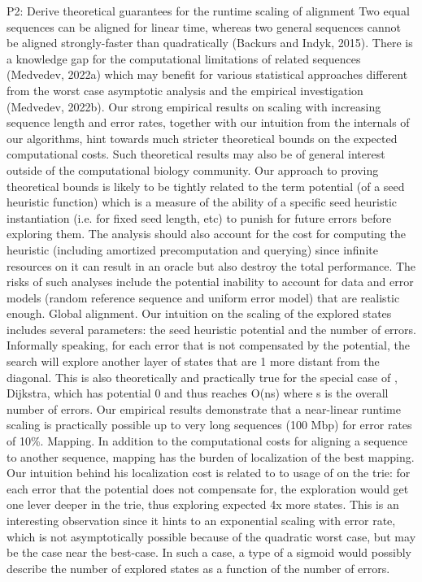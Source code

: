 P2: Derive theoretical guarantees for the runtime scaling of \A alignment Two
equal sequences can be aligned for linear time, whereas two general sequences
cannot be aligned strongly-faster than quadratically (Backurs and Indyk, 2015).
There is a knowledge gap for the computational limitations of related sequences
(Medvedev, 2022a) which may benefit for various statistical approaches different
from the worst case asymptotic analysis and the empirical investigation
(Medvedev, 2022b). Our strong empirical results on scaling with increasing
sequence length and error rates, together with our intuition from the internals
of our \A algorithms, hint towards much stricter theoretical bounds on the
expected computational costs. Such theoretical results may also be of general
interest outside of the computational biology community. Our approach to proving
theoretical bounds is likely to be tightly related to the term potential (of a
seed heuristic function) which is a measure of the ability of a specific seed
heuristic instantiation (i.e. for fixed seed length, etc) to punish for future
errors before exploring them. The analysis should also account for the cost for
computing the heuristic (including amortized precomputation and querying) since
infinite resources on it can result in an oracle but also destroy the total
performance. The risks of such analyses include the potential inability to
account for data and error models (random reference sequence and uniform error
model) that are realistic enough. Global alignment. Our intuition on the scaling
of the explored states includes several parameters: the seed heuristic potential
and the number of errors. Informally speaking, for each error that is not
compensated by the potential, the \A search will explore another layer of states
that are 1 more distant from the diagonal. This is also theoretically and
practically true for the special case of \A, Dijkstra, which has potential 0 and
thus reaches O(ns) where s is the overall number of errors. Our empirical
results demonstrate that a near-linear runtime scaling is practically possible
up to very long sequences (100 Mbp) for error rates of 10\%. Mapping. In
addition to the computational costs for aligning a sequence to another sequence,
mapping has the burden of localization of the best mapping. Our intuition behind
his localization cost is related to to usage of \A on the trie: for each error
that the \A potential does not compensate for, the exploration would get one
lever deeper in the trie, thus exploring expected 4x more states. This is an
interesting observation since it hints to an exponential scaling with error
rate, which is not asymptotically possible because of the quadratic worst case,
but may be the case near the best-case. In such a case, a type of a sigmoid
would possibly describe the number of explored states as a function of the
number of errors.

